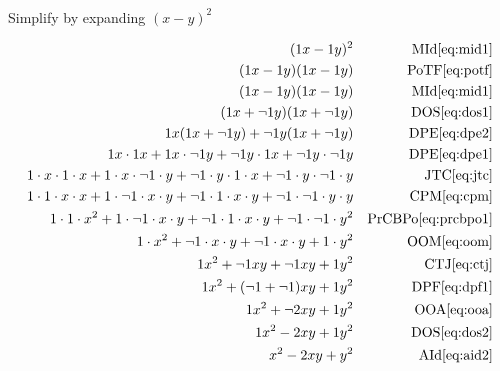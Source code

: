 \documentclass[20150903-160354-rs2.2-MarksMathNotebook.tex]{subfiles}
\begin{document}
\begin{example}[id:20151018-182202] \label{20151018-182202} \hfill \\
Simplify by expanding $(x-y)^2$

\soln

\solnsteps
\begin{align*}
(1x-1y)^2 && \text{MId} \eqref{eq:mid1} \\
(1x-1y)(1x-1y) && \text{PoTF} \eqref{eq:potf} \\
(1x-1y)(1x-1y) && \text{MId} \eqref{eq:mid1} \\
(1x + \neg 1y)(1x + \neg 1y) && \text{DOS} \eqref{eq:dos1} \\
1x(1x+\neg 1y) + \neg 1y(1x+\neg 1y) && \text{DPE} \eqref{eq:dpe2} \\
1x \cdot 1x + 1x \cdot \neg 1y + \neg 1y \cdot 1x + \neg 1y \cdot \neg 1y && \text{DPE} \eqref{eq:dpe1} \\
1 \cdot x \cdot 1 \cdot x + 1 \cdot x \cdot \neg 1 \cdot y + \neg 1 \cdot y \cdot 1 \cdot x + \neg 1 \cdot y \cdot \neg 1 \cdot y && \text{JTC} \eqref{eq:jtc} \\
1 \cdot 1 \cdot x \cdot x + 1 \cdot \neg 1 \cdot x \cdot y + \neg 1 \cdot 1 \cdot x \cdot y + \neg 1 \cdot \neg 1 \cdot y \cdot y && \text{CPM} \eqref{eq:cpm} \\
1 \cdot 1 \cdot x^2 + 1 \cdot \neg 1 \cdot x \cdot y + \neg 1 \cdot 1 \cdot x \cdot y + \neg 1 \cdot \neg 1 \cdot y^2 && \text{PrCBPo} \eqref{eq:prcbpo1} \\
1 \cdot x^2 + \neg 1 \cdot x \cdot y + \neg 1 \cdot x \cdot y + 1 \cdot y^2 && \text{OOM} \eqref{eq:oom} \\
1x^2 + \neg 1xy + \neg 1xy + 1y^2 && \text{CTJ} \eqref{eq:ctj} \\
1x^2 + (\neg 1 + \neg 1)xy + 1y^2 && \text{DPF} \eqref{eq:dpf1} \\
1x^2 + \neg 2xy + 1y^2 && \text{OOA} \eqref{eq:ooa} \\
1x^2 - 2xy + 1y^2 && \text{DOS} \eqref{eq:dos2} \\
x^2-2xy+y^2 && \text{AId} \eqref{eq:aid2} 
\end{align*}
\end{example}
\end{document}
